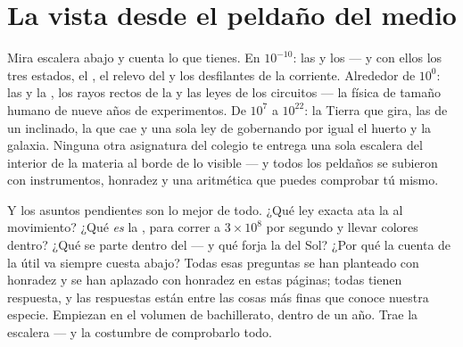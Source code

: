 \section{La vista desde el peldaño del medio}

\begin{remark}\label{rem:g9:atoms-to-galaxies:built}
Mira escalera abajo y cuenta lo que tienes. En $10^{-10}$: las
 y los  --- y con ellos los tres estados,
el , el relevo del  y los desfilantes de la
corriente. Alrededor de $10^{0}$: las  y la
, los rayos rectos de la  y las leyes de los
circuitos --- la física de tamaño humano de nueve años de experimentos.
De $10^{7}$ a $10^{22}$: la Tierra que gira, las  de un
 inclinado, la  que cae y una sola ley de
 gobernando por igual el huerto y la galaxia. Ninguna
otra asignatura del colegio te entrega una sola escalera del interior
de la materia al borde de lo visible --- y todos los peldaños se
subieron con instrumentos, honradez y una aritmética que puedes
comprobar tú mismo.
\end{remark}

\begin{remark}\label{rem:g9:atoms-to-galaxies:ahead}
Y los asuntos pendientes son lo mejor de todo. ¿Qué ley exacta ata la
 al movimiento? ¿Qué \emph{es} la , para correr a
$3 \times 10^{8}$  por segundo y llevar colores dentro?
¿Qué se parte dentro del  --- y qué forja la  del Sol?
¿Por qué la cuenta de la  útil va siempre cuesta abajo? Todas
esas preguntas se han planteado con honradez y se han aplazado con
honradez en estas páginas; todas tienen respuesta, y las respuestas
están entre las cosas más finas que conoce nuestra especie. Empiezan en
el volumen de bachillerato, dentro de un año. Trae la escalera --- y la
costumbre de comprobarlo todo.
\end{remark}

